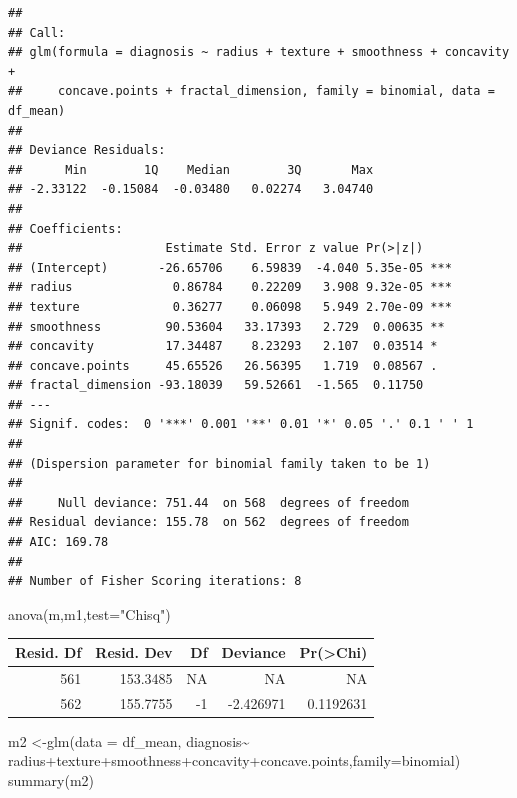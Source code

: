 \documentclass[
  11pt,
]{article}
\newenvironment{Shaded}{\begin{snugshade}}{\end{snugshade}}
\newcommand{\AttributeTok}[1]{\textcolor[rgb]{0.77,0.63,0.00}{#1}}
\newcommand{\FunctionTok}[1]{\textcolor[rgb]{0.00,0.00,0.00}{#1}}
\newcommand{\NormalTok}[1]{#1}
\newcommand{\OtherTok}[1]{\textcolor[rgb]{0.56,0.35,0.01}{#1}}
\newcommand{\SpecialCharTok}[1]{\textcolor[rgb]{0.00,0.00,0.00}{#1}}
\newcommand{\StringTok}[1]{\textcolor[rgb]{0.31,0.60,0.02}{#1}}
\begin{document}
\begin{verbatim}
## 
## Call:
## glm(formula = diagnosis ~ radius + texture + smoothness + concavity + 
##     concave.points + fractal_dimension, family = binomial, data = df_mean)
## 
## Deviance Residuals: 
##      Min        1Q    Median        3Q       Max  
## -2.33122  -0.15084  -0.03480   0.02274   3.04740  
## 
## Coefficients:
##                    Estimate Std. Error z value Pr(>|z|)    
## (Intercept)       -26.65706    6.59839  -4.040 5.35e-05 ***
## radius              0.86784    0.22209   3.908 9.32e-05 ***
## texture             0.36277    0.06098   5.949 2.70e-09 ***
## smoothness         90.53604   33.17393   2.729  0.00635 ** 
## concavity          17.34487    8.23293   2.107  0.03514 *  
## concave.points     45.65526   26.56395   1.719  0.08567 .  
## fractal_dimension -93.18039   59.52661  -1.565  0.11750    
## ---
## Signif. codes:  0 '***' 0.001 '**' 0.01 '*' 0.05 '.' 0.1 ' ' 1
## 
## (Dispersion parameter for binomial family taken to be 1)
## 
##     Null deviance: 751.44  on 568  degrees of freedom
## Residual deviance: 155.78  on 562  degrees of freedom
## AIC: 169.78
## 
## Number of Fisher Scoring iterations: 8
\end{verbatim}

\begin{Shaded}
\begin{Highlighting}[]
\FunctionTok{anova}\NormalTok{(m,m1,}\AttributeTok{test=}\StringTok{"Chisq"}\NormalTok{)}
\end{Highlighting}
\end{Shaded}

\begin{tabular}{r|r|r|r|r}
\hline
Resid. Df & Resid. Dev & Df & Deviance & Pr(>Chi)\\
\hline
561 & 153.3485 & NA & NA & NA\\
\hline
562 & 155.7755 & -1 & -2.426971 & 0.1192631\\
\hline
\end{tabular}

\begin{Shaded}
\begin{Highlighting}[]
\NormalTok{m2 }\OtherTok{\textless{}{-}}\FunctionTok{glm}\NormalTok{(}\AttributeTok{data =}\NormalTok{ df\_mean, diagnosis}\SpecialCharTok{\textasciitilde{}}\NormalTok{ radius}\SpecialCharTok{+}\NormalTok{texture}\SpecialCharTok{+}\NormalTok{smoothness}\SpecialCharTok{+}\NormalTok{concavity}\SpecialCharTok{+}\NormalTok{concave.points,}\AttributeTok{family=}\NormalTok{binomial)}
\FunctionTok{summary}\NormalTok{(m2)}
\end{Highlighting}
\end{Shaded}
\end{document}
